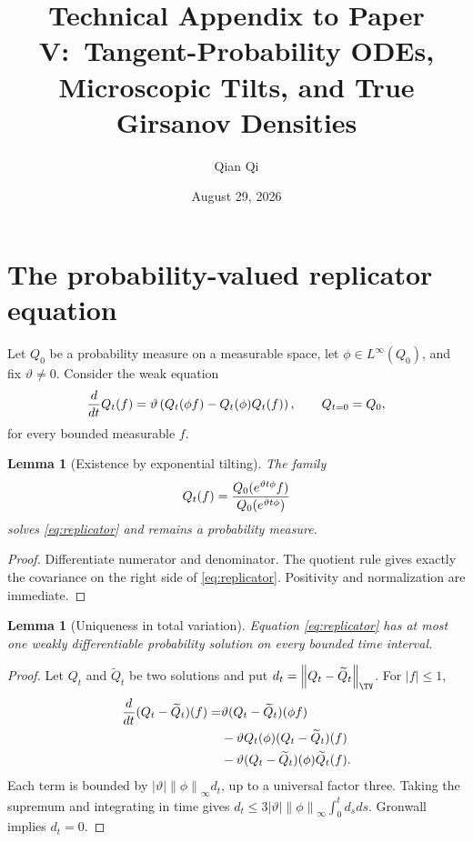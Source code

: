 \documentclass[11pt,reqno]{amsart}
\title{Technical Appendix to Paper V:\ Tangent-Probability ODEs, Microscopic Tilts, and True Girsanov Densities}
\author{Qian Qi}
\date{August 29, 2026}
\newtheorem{lemma}[theorem]{Lemma}
\theoremstyle{definition}
\newcommand{\norm}[1]{\left\lVert#1\right\rVert}
\newcommand{\abs}[1]{\left\lvert#1\right\rvert}
\begin{document}
\maketitle

\section{The probability-valued replicator equation}

Let $Q_0$ be a probability measure on a measurable space, let
$\phi\in L^\infty(Q_0)$, and fix $\vartheta\ne0$.  Consider the weak equation
\begin{equation}\label{eq:replicator}
 {d\over dt}Q_t(f)
 =\vartheta\left(Q_t(\phi f)-Q_t(\phi)Q_t(f)\right),
 \qquad Q_{t=0}=Q_0,
\end{equation}
for every bounded measurable $f$.

\begin{lemma}[Existence by exponential tilting]\label{lem:tilt-solution}
The family
\begin{equation}\label{eq:explicit-tilt}
 Q_t(f)={Q_0(e^{\vartheta t\phi}f)
 \over Q_0(e^{\vartheta t\phi})}
\end{equation}
solves \eqref{eq:replicator} and remains a probability measure.
\end{lemma}

\begin{proof}
Differentiate numerator and denominator.  The quotient rule gives exactly the
covariance on the right side of \eqref{eq:replicator}.  Positivity and
normalization are immediate.
\end{proof}

\begin{lemma}[Uniqueness in total variation]\label{lem:replicator-unique}
Equation \eqref{eq:replicator} has at most one weakly differentiable
probability solution on every bounded time interval.
\end{lemma}

\begin{proof}
Let $Q_t$ and $\widetilde Q_t$ be two solutions and put
$d_t=\norm{Q_t-\widetilde Q_t}_{\TV}$.  For $\abs f\le1$,
\begin{align*}
 {d\over dt}(Q_t-\widetilde Q_t)(f)
 =&\vartheta(Q_t-\widetilde Q_t)(\phi f)\\
 &-\vartheta Q_t(\phi)(Q_t-\widetilde Q_t)(f)\\
 &-\vartheta(Q_t-\widetilde Q_t)(\phi)\widetilde Q_t(f).
\end{align*}
Each term is bounded by
$\abs\vartheta\norm\phi_\infty d_t$, up to a universal factor three.  Taking
the supremum and integrating in time gives
$d_t\le3\abs\vartheta\norm\phi_\infty\int_0^td_sds$.  Gronwall implies
$d_t=0$.
\end{proof}
\end{document}
